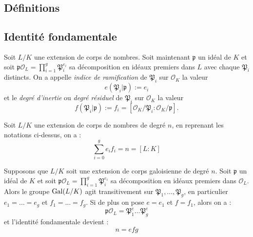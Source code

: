 \documentclass[a4paper]{article} %
\numberwithin{section}{part}
\numberwithin{equation}{section}
\newcommand\EO{\mathcal{O}}
\begin{document}
\subsection{Définitions}

\subsection{Identité fondamentale}
\begin{defn}
Soit $L/K$ une extension de corps de nombres. Soit maintenant $\mathfrak{p}$ un 
idéal de $K$ et soit $\mathfrak{p}\EO_L = \prod_{i=1}^{g}{\mathfrak{P}_i^{e_i}}$
sa décomposition en idéaux premiers dans $L$ avec chaque $\mathfrak{P}_i$
distincts. On a appelle \emph{indice de ramification} de $\mathfrak{P}_i$ sur 
$\EO_K$ la valeur 
\begin{equation}
e(\mathfrak{P}_i\vert \mathfrak{p}) := e_i
\end{equation}
et le \emph{degré d'inertie} ou \emph{degré résiduel} de $\mathfrak{P}_i$ sur
$\EO_K$ la valeur
\begin{equation}
f(\mathfrak{P}_i\vert \mathfrak{p}) := f_i =
[\EO_K/\mathfrak{P}_i:\EO_K/\mathfrak{p}].
\end{equation}
\end{defn}

\begin{thm}
\label{th:fundid}
Soit $L/K$ une extension de corps de nombres de degré $n$, en reprenant les 
notations ci-dessus, on a :
\begin{equation}
\sum_{i=0}^g{e_if_i} = n = [L:K]
\end{equation}
\end{thm}

\begin{thm}
\label{th:fundidgal}
Supposons que $L/K$ soit une extension de corps galoisienne de degré $n$. Soit
$\mathfrak{p}$ un idéal de $K$ et soit $\mathfrak{p}\EO_L = 
\prod_{i=1}^{g}{\mathfrak{P}_i^{e_i}}$ sa décomposition en idéaux premiers dans
$\EO_L$. Alors le groupe $\textup{Gal}(L/K)$ agit transitivement sur
$\mathfrak{P}_1,\dots,\mathfrak{P}_g$, en particulier $e_1 = \dots = e_g$ et
$f_1 = \dots = f_g$. Si de plus on pose $e = e_1$ et $f = f_1$, alors on a :
\begin{equation}
\mathfrak{p}\EO_L = \mathfrak{P}_1^e\dots\mathfrak{P}_g^e
\end{equation}
et l'identité fondamentale devient :
\begin{equation}
n = efg
\end{equation}
\end{thm}
\end{document}
